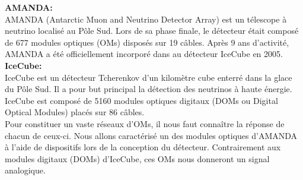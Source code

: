 \textbf{AMANDA:}\\
AMANDA (Antarctic Muon and Neutrino Detector Array) est un télescope à neutrino localisé au Pôle Sud. Lors de sa phase finale, le détecteur était composé de 677 modules optiques (OMs) disposés sur 19 câbles. Après 9 ans d'activité, AMANDA a été officiellement incorporé dans au détecteur IceCube en 2005.\\

\textbf{IceCube:}\\
IceCube est un détecteur Tcherenkov d'un kilomètre cube enterré dans la glace du Pôle Sud. Il a pour but principal la détection des neutrinos à haute énergie. IceCube est composé de 5160 modules optiques digitaux (DOMs ou Digital Optical Modules) placés sur 86 câbles.\\

Pour constituer un vaste réseaux d'OMs, il nous faut connaître la réponse de chacun de ceux-ci. Nous allons caractérisé un des modules optiques d'AMANDA à l'aide de dispositifs lors de la conception du détecteur. Contrairement aux modules digitaux (DOMs) d'IceCube, ces OMs nous donneront un signal analogique. 


